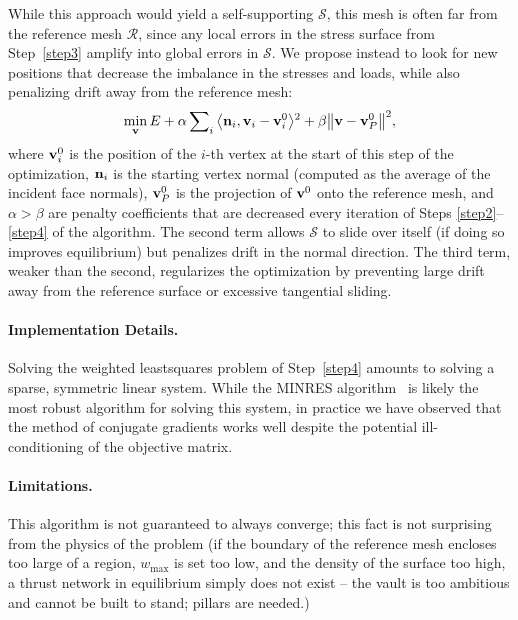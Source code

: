 \documentclass[review]{acmsiggraph}
\def\<{\mathchoice{\big\langle}{\langle}{\langle}{\langle}}
\def\>{\mathchoice{\big\rangle}{\rangle}{\rangle}{\rangle}}
\def\SS{{\mathcal S}}
\def\RR{{\mathcal R}}
\begin{document}
While this approach would yield a self-supporting $\SS$, this mesh is 
often far from the reference mesh $\RR$, since any local errors in the 
stress surface from Step~\ref{step3} amplify into global errors in $\SS$. 
We propose instead to look for new positions that decrease the imbalance 
in the stresses and loads, while also penalizing drift away from the 
reference mesh:
	\begin{align*}
	\min_{\vw} E
	+ \alpha \sum\nolimits_i
		\<\nw_i, \vw_i - \vw^0_i \>^2
		+ \beta \big\|\vw - \vw^0_P\big\|^2,
	\end{align*}
 where ${\mathbf v}^0_i$ is the position of the $i$-th vertex at the start of this 
step of the optimization, ${\mathbf n}_i$ is the starting vertex normal (computed 
as the average of the incident face normals), ${\mathbf v}^0_P$ is the projection 
of ${\mathbf v}^0$ onto the reference mesh, and $\alpha > \beta$ are penalty 
coefficients that are decreased every iteration of Steps 
\ref{step2}--\ref{step4} of the algorithm. The second term allows $\SS$ to 
slide over itself (if doing so improves equilibrium) but penalizes drift 
in the normal direction. The third term, weaker than the second, 
regularizes the optimization by preventing large drift away from the 
reference surface or excessive tangential sliding.

\paragraph{Implementation Details.}

Solving the weighted least\dash squares problem of Step~\ref{step4} 
amounts to solving a sparse, symmetric linear system. While the MINRES 
algorithm~\cite{paige75} is likely the most robust algorithm for solving 
this system, in practice we have observed that the method of conjugate 
gradients works well despite the potential ill-conditioning of the 
objective matrix.

\paragraph{Limitations.}

This algorithm is not guaranteed to always converge; this fact is not 
surprising from the physics of the problem (if the boundary of the 
reference mesh encloses too large of a region, $w_{\max}$ is set too low, 
and the density of the surface too high, a thrust network in equilibrium 
simply does not exist -- the vault is too ambitious and cannot be built to 
stand; pillars are needed.)
\end{document}

